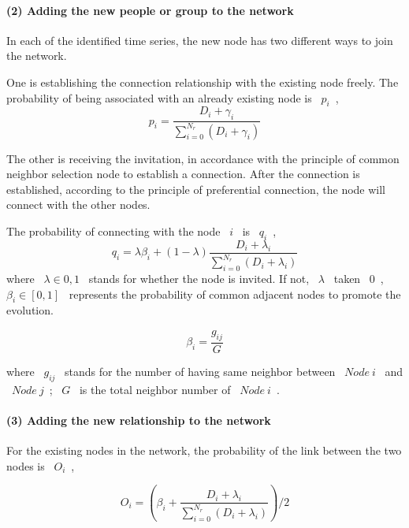 \documentclass[a4paper,11pt]{article}
\begin{document}
\paragraph{(2) Adding the new people or group to the network}
\text{\\}
\par In each of the identified time series, the new node has two different ways to join the network.
\par One is establishing the connection relationship with the existing node freely. The probability of being associated with an already existing node is ~$p_i$~,
\begin{equation}
p_i=\frac{D_i+\gamma _i}{{\sum\limits_{i=0}^{N_r}}(D_i+\gamma _i)}
\end{equation}
\par The other is receiving the invitation, in accordance with the principle of common neighbor selection node to establish a connection. After the connection is established, according to the principle of preferential connection, the node will connect with the other nodes. 
\par The probability of connecting with the node ~$i$~ is ~$q_i$~, 
\begin{equation}
q_i=\lambda \beta _i+(1-\lambda ){\frac{{{D_i} + {\lambda _i}}}{{\sum\limits_{i = 0}^{{N_r}} {({D_i} + {\lambda _i})} }}}  
\end{equation}
where ~$\lambda\in {0,1}$~ stands for whether the node is invited. If not, ~$\lambda$~ taken ~$0$~, ~$\beta _i \in [0,1]$~ represents the probability of common adjacent nodes to promote the evolution.

\begin{equation}
\beta_i={\frac{g_{ij}}{G}}
\end{equation}

where ~$g_{ij}$~ stands for the number of having same neighbor between ~$Node~i$~ and ~$Node~j$~; ~$G$~ is the total neighbor number of ~$Node~i$~.
\paragraph{(3) Adding the new relationship to the network}
\text{\\}
\par For the existing nodes in the network, the probability of the link between the two nodes is ~$O_i$~,


\begin{equation}
{O_i} = ({\beta _i} + \frac{{{D_i} + {\lambda _i}}}{{\sum\limits_{i = 0}^{{N_r}} {({D_i} + {\lambda _i})} }})/2
\end{equation}
\end{document}
